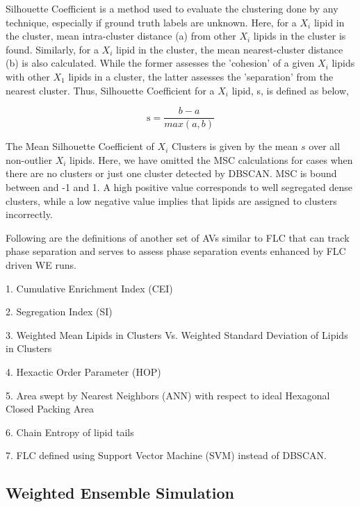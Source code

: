 \documentclass{biophys-new}
\begin{document}
Silhouette Coefficient is a method used to evaluate the clustering done by any technique, especially if ground truth labels are unknown. 
Here, for a $X_i$ lipid in the cluster, mean intra-cluster distance (a) from other $X_i$ lipids in the cluster is found.  
Similarly, for a $X_i$ lipid in the cluster, the mean nearest-cluster distance (b) is also calculated.
While the former assesses the 'cohesion' of a given $X_i$ lipids with other $X_1$ lipids in a cluster, the latter assesses the 'separation' from the nearest cluster.
Thus, Silhouette Coefficient for a $X_i$ lipid, s, is defined as below,

\begin{equation}
\label{eq:SC}
\text{s} = \frac{b - a}{max(a,b)}
\end{equation}

The Mean Silhouette Coefficient of $X_i$ Clusters is given by the mean $s$ over all non-outlier $X_i$ lipids.
Here, we have omitted the MSC calculations for cases when there are no clusters or just one cluster detected by DBSCAN. 
MSC is bound between and -1 and 1.
A high positive value corresponds to well segregated dense clusters, while a low negative value implies that lipids are assigned to clusters incorrectly.  

Following are the definitions of another set of AVs similar to FLC that can track phase separation and serves to assess phase separation events enhanced by FLC driven WE runs.

1. Cumulative Enrichment Index (CEI)

2. Segregation Index (SI)

3. Weighted Mean Lipids in Clusters Vs. Weighted Standard Deviation of Lipids in Clusters

4. Hexactic Order Parameter (HOP)

5. Area swept by Nearest Neighbors (ANN) with respect to ideal Hexagonal Closed Packing Area

6. Chain Entropy of lipid tails

7. FLC defined using Support Vector Machine (SVM) instead of DBSCAN.

\subsection*{Weighted Ensemble Simulation}
\end{document}
